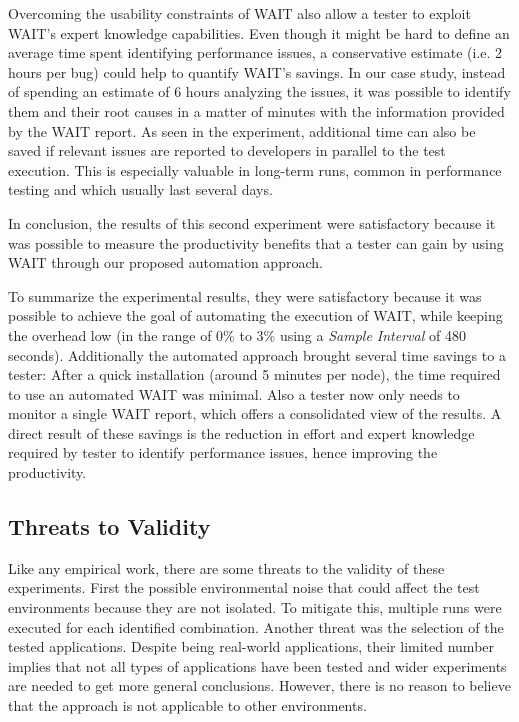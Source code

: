 \documentclass[runningheads,a4paper]{llncs}
\begin{document}
Overcoming the usability constraints of WAIT also allow a tester to exploit
WAIT's expert knowledge capabilities. Even though it might be hard to define an
average time spent identifying performance issues, a conservative estimate (i.e.
2 hours per bug) could help to quantify WAIT's savings. In our case study,
instead of spending an estimate of 6 hours analyzing the issues, it was possible to
identify them and their root causes in a matter of minutes with the information
provided by the WAIT report. As seen in the experiment, additional time can also
be saved if relevant issues are reported to developers in parallel to the test
execution. This is especially valuable in long-term runs, common in performance
testing and which usually last several days.

In conclusion, the results of this second experiment were satisfactory
because it was possible to measure the productivity benefits that a tester can
gain by using WAIT through our proposed automation approach.

To summarize the experimental results, they were satisfactory because it
was possible to achieve the goal of automating the execution of WAIT,
while keeping the overhead low (in the range of 0\% to 3\% using a \emph{Sample
Interval} of 480 seconds). Additionally the automated approach brought several
time savings to a tester: After a quick installation (around 5 minutes per node), the
time required to use an automated WAIT was minimal. Also a tester now only
needs to monitor a single WAIT report, which offers a consolidated view of the
results. A direct result of these savings is the reduction in effort and expert
knowledge required by tester to identify performance issues, hence improving the
productivity.

\vspace{-5pt}
\subsection{Threats to Validity}
\vspace{-5pt}
Like any empirical work, there are some threats to the validity of these
experiments. First the possible environmental noise that could affect the test
environments because they are not isolated. To mitigate this, multiple runs were
executed for each identified combination. Another threat was the selection of
the tested applications. Despite being real-world applications, their limited
number implies that not all types of applications have been tested and wider
experiments are needed to get more general conclusions. However, there is no
reason to believe that the approach is not applicable to other environments.
\end{document}
